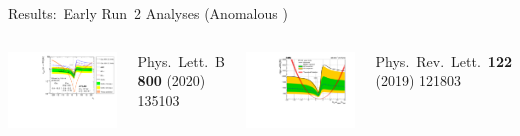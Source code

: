 \documentclass[11pt, xcolor={dvipsnames}, aspectratio=169]{beamer}
\begin{document}

\begin{frame}{Results:\ Early Run~2 Analyses (Anomalous \allbold{\klambda})}
  \begin{columns}
    \centering\footnotesize

    \includegraphics[width=\textwidth]{status/atlas_36ifb_klambda}

    Phys.\ Lett.\ B \textbf{800} (2020) 135103

    \centering\footnotesize

    \includegraphics[width=\textwidth]{status/cms_36ifb_klambda}

    Phys.\ Rev.\ Lett.\ \textbf{122} (2019) 121803
  \end{columns}
\end{frame}
\end{document}
